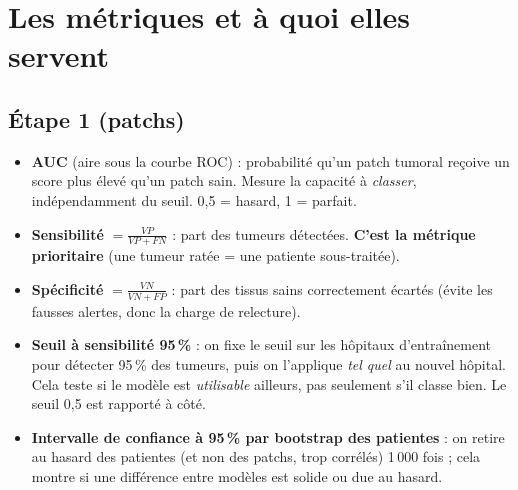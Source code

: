 \documentclass[11pt,a4paper]{article}
\begin{document}
\section{Les métriques et à quoi elles servent}

\subsection{Étape 1 (patchs)}
\begin{itemize}
  \item \textbf{AUC} (aire sous la courbe ROC) : probabilité qu'un patch tumoral reçoive un score plus élevé qu'un patch sain.
        Mesure la capacité à \emph{classer}, indépendamment du seuil. 0,5 = hasard, 1 = parfait.
  \item \textbf{Sensibilité} $= \frac{VP}{VP+FN}$ : part des tumeurs détectées. \textbf{C'est la métrique prioritaire}
        (une tumeur ratée = une patiente sous-traitée).
  \item \textbf{Spécificité} $= \frac{VN}{VN+FP}$ : part des tissus sains correctement écartés (évite les fausses alertes,
        donc la charge de relecture).
  \item \textbf{Seuil à sensibilité 95\,\%} : on fixe le seuil sur les hôpitaux d'entraînement pour détecter 95\,\% des tumeurs,
        puis on l'applique \emph{tel quel} au nouvel hôpital. Cela teste si le modèle est \emph{utilisable} ailleurs, pas seulement
        s'il classe bien. Le seuil 0,5 est rapporté à côté.
  \item \textbf{Intervalle de confiance à 95\,\% par bootstrap des patientes} : on retire au hasard des patientes (et non des patchs,
        trop corrélés) 1\,000 fois ; cela montre si une différence entre modèles est solide ou due au hasard.
\end{itemize}
\end{document}
